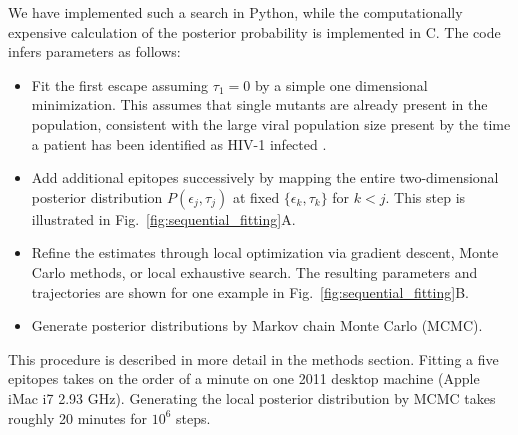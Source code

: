 \documentclass{frontiers}
\newcommand{\FIG}[1]{Fig.~\ref{fig:#1}}
\newcommand{\fcoeff}{\epsilon}
\begin{document}
We have implemented such a search in Python, while the computationally expensive
calculation of the posterior probability is implemented in C. The code infers
parameters as follows:
\begin{itemize}
  \item Fit the first escape assuming $\tau_1=0$ by a
  simple one dimensional minimization. This assumes that single mutants
  are already present in the population, consistent with the large viral population
  size present by the time a patient has been identified as HIV-1 infected \citep{coffin_hiv_1995,perelson_dynamics_1997}.
  \item Add additional epitopes successively by mapping the entire two-dimensional
  posterior distribution $P(\fcoeff_j,\tau_j)$ at fixed $\{\fcoeff_k,\tau_k\}$
  for $k<j$. This step is illustrated in \FIG{sequential_fitting}A.
  \item Refine the estimates through local optimization via gradient descent, Monte
  Carlo methods, or local exhaustive search. The resulting parameters and
  trajectories are shown for one example in \FIG{sequential_fitting}B.
  \item Generate posterior distributions by Markov chain Monte Carlo (MCMC). 
\end{itemize}

This procedure is described in more detail in the methods section. Fitting a five epitopes
takes on the order of a minute on one 2011 desktop machine (Apple iMac i7 2.93 GHz). Generating
the local posterior distribution by MCMC takes roughly 20 minutes for $10^{6}$ steps.
\end{document}

